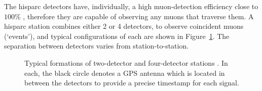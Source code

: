 The \gls{hisparc} detectors have, individually, a high muon-detection
efficiency close to $100\%$ \citep{fokkema_hisparc_2012, van_dam_hisparc_2020}, therefore they are capable of observing any muons that traverse them. A \gls{hisparc} station combines either 2 or 4 detectors, to observe coincident muons (`events'), and typical configurations of each are shown in Figure~\ref{fig:HS_station_layouts}. The separation between detectors varies from station-to-station. 


\begin{figure}[htbp!]
	\centering
	\qquad
	\qquad
	\caption{Typical formations of two-detector and four-detector stations \citep{fokkema_hisparc_2012, van_dam_hisparc_2020}. In each, the black circle denotes a GPS antenna which is located in between the detectors to provide a precise timestamp for each signal.}
	\label{fig:HS_station_layouts}
\end{figure}



